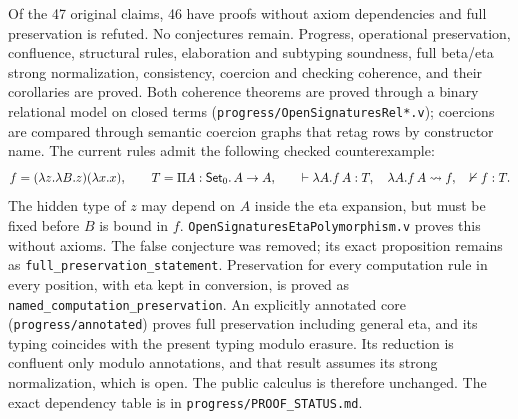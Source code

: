 \newpage
{}
Of the 47 original claims, 46 have proofs without axiom dependencies and
full preservation is refuted. No conjectures remain. Progress, operational
preservation, confluence, structural rules, elaboration and subtyping
soundness, full beta/eta strong normalization, consistency, coercion and
checking coherence, and their corollaries are proved. Both coherence
theorems are proved through a binary relational model on closed terms
(\texttt{progress/OpenSignaturesRel*.v}); coercions are compared through
semantic coercion graphs that retag rows by constructor name.
The current rules admit the following checked counterexample:
\[
 f=(\lambda z.\lambda B.z)(\lambda x.x),\qquad
 T=\Pi A:\mathsf{Set}_0.\,A\to A,\qquad
 \vdash\lambda A.f\,A:T,\quad \lambda A.f\,A\leadsto f,\quad
 \nvdash f:T.
\]
The hidden type of $z$ may depend on $A$ inside the eta expansion, but must
be fixed before $B$ is bound in $f$.
\texttt{OpenSignaturesEtaPolymorphism.v} proves this without axioms.
The false conjecture was removed; its exact proposition remains as
\texttt{full\_preservation\_statement}. Preservation for every computation
rule in every position, with eta kept in conversion, is proved as
\texttt{named\_computation\_preservation}. An explicitly annotated core
(\texttt{progress/annotated}) proves full preservation including general eta,
and its typing coincides with the present typing modulo erasure. Its reduction
is confluent only modulo annotations, and that result assumes its strong
normalization, which is open. The public calculus is therefore unchanged.
The exact dependency table is in \texttt{progress/PROOF\_STATUS.md}.
